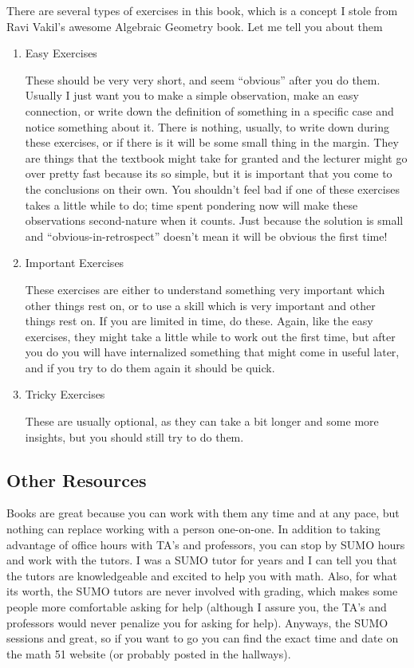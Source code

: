 There are several types of exercises in this book, which is a concept I stole from Ravi Vakil's awesome Algebraic Geometry book.
Let me tell you about them
\begin{enumerate}[$\bullet$]
  \item Easy Exercises

    These should be very very short, and seem ``obvious'' after you do them.  
    Usually I just want you to make a simple observation, make an easy connection, or write down the definition of something in a specific case and notice something about it.
    There is nothing, usually, to write down during these exercises, or if there is it will be some small thing in the margin.
    They are things that the textbook might take for granted and the lecturer might go over pretty fast because its so simple, but it is important that you come to the conclusions on their own.
    You shouldn't feel bad if one of these exercises takes a little while to do; time spent pondering now will make these observations second-nature when it counts.
    Just because the solution is small and ``obvious-in-retrospect'' doesn't mean it will be obvious the first time!

  \item Important Exercises
    
    These exercises are either to understand something very important which other things rest on, or to use a skill which is very important and other things rest on.
    If you are limited in time, do these.
    Again, like the easy exercises, they might take a little while to work out the first time, but after you do you will have internalized something that might come in useful later, and if you try to do them again it should be quick.

  \item Tricky Exercises

    These are usually optional, as they can take a bit longer and some more insights, but you should still try to do them.
\end{enumerate}
    
\subsection*{Other Resources}

Books are great because you can work with them any time and at any pace, but nothing can replace working with a person one-on-one.
In addition to taking advantage of office hours with TA's and professors, you can stop by SUMO hours and work with the tutors.
I was a SUMO tutor for years and I can tell you that the tutors are knowledgeable and excited to help you with math.
Also, for what its worth, the SUMO tutors are never involved with grading, which makes some people more comfortable asking for help (although I assure you, the TA's and professors would never penalize you for asking for help).  
Anyways, the SUMO sessions and great, so if you want to go you can find the exact time and date on the math 51 website (or probably posted in the hallways).  

